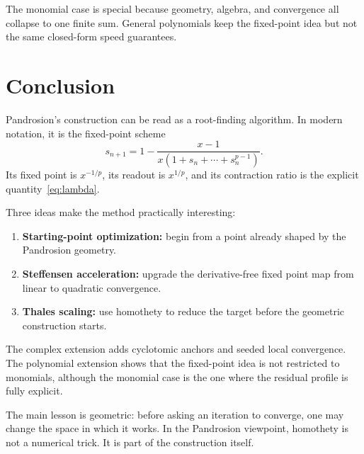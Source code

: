 \documentclass[11pt,a4paper]{article}
\theoremstyle{plain}
\theoremstyle{definition}
\theoremstyle{remark}
\newenvironment{takeaway}{%
  \begin{center}\begin{minipage}{0.92\linewidth}\small\itshape\color{blue!45!black}%
}{%
  \end{minipage}\end{center}%
}
\begin{document}
\begin{takeaway}
The monomial case is special because geometry, algebra, and convergence all
collapse to one finite sum.  General polynomials keep the fixed-point idea but
not the same closed-form speed guarantees.
\end{takeaway}

\section{Conclusion}
\label{sec:conclusion}

Pandrosion's construction can be read as a root-finding algorithm.  In modern
notation, it is the fixed-point scheme
\[
  s_{n+1}=1-\frac{x-1}{x(1+s_n+\cdots+s_n^{p-1})}.
\]
Its fixed point is $x^{-1/p}$, its readout is $x^{1/p}$, and its contraction
ratio is the explicit quantity~\eqref{eq:lambda}.

Three ideas make the method practically interesting:

\begin{enumerate}
  \item \textbf{Starting-point optimization:} begin from a point already shaped
  by the Pandrosion geometry.
  \item \textbf{Steffensen acceleration:} upgrade the derivative-free fixed
  point map from linear to quadratic convergence.
  \item \textbf{Thales scaling:} use homothety to reduce the target before the
  geometric construction starts.
\end{enumerate}

The complex extension adds cyclotomic anchors and seeded local convergence.
The polynomial extension shows that the fixed-point idea is not restricted to
monomials, although the monomial case is the one where the residual profile is
fully explicit.

The main lesson is geometric: before asking an iteration to converge, one may
change the space in which it works.  In the Pandrosion viewpoint, homothety is
not a numerical trick.  It is part of the construction itself.
\end{document}
